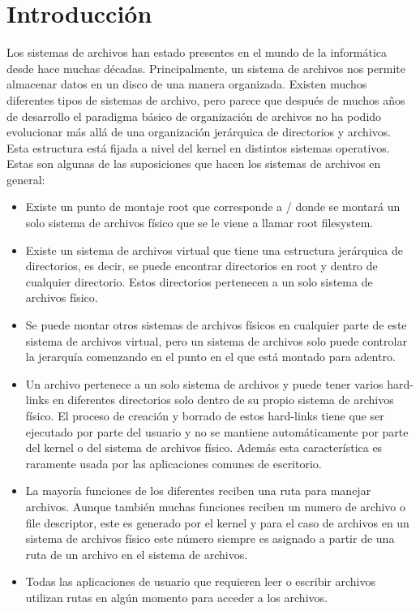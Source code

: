 \chapter{Introducción}
\ifpdf
    \graphicspath{{Introduction/IntroductionFigs/PNG/}{Introduction/IntroductionFigs/PDF/}{Introduction/IntroductionFigs/}}
\else
    \graphicspath{{Introduction/IntroductionFigs/EPS/}{Introduction/IntroductionFigs/}}
\fi

Los sistemas de archivos han estado presentes en el mundo de la informática desde hace muchas décadas. Principalmente, un sistema de archivos nos permite almacenar datos en un disco de una manera organizada. Existen muchos diferentes tipos de sistemas de archivo, pero parece que después de muchos años de desarrollo el paradigma básico de organización de archivos no ha podido evolucionar más allá de una organización jerárquica de directorios y archivos. Esta estructura está fijada a nivel del kernel en distintos sistemas operativos. Estas son algunas de las suposiciones que hacen los sistemas de archivos en general:

\begin{itemize}
\item Existe un punto de montaje root que corresponde a / donde se montará un solo sistema de archivos físico que se le viene a llamar root filesystem.
\item Existe un sistema de archivos virtual que tiene una estructura jerárquica de directorios, es decir, se puede encontrar directorios en root y dentro de cualquier directorio. Estos directorios pertenecen a un solo sistema de archivos físico.
\item Se puede montar otros sistemas de archivos físicos en cualquier parte de este sistema de archivos virtual, pero un sistema de archivos solo puede controlar la jerarquía comenzando en el punto en el que está montado para adentro.
\item Un archivo pertenece a un solo sistema de archivos y puede tener varios hard-links en diferentes directorios solo dentro de su propio sistema de archivos físico. El proceso de creación y borrado de estos hard-links tiene que ser ejecutado por parte del usuario y no se mantiene automáticamente por parte del kernel o del sistema de archivos físico. Además esta característica es raramente usada por las aplicaciones comunes de escritorio.
\item La mayoría funciones de los diferentes reciben una ruta para manejar archivos. Aunque también muchas funciones reciben un numero de archivo o file descriptor, este es generado por el kernel y para el caso de archivos en un sistema de archivos físico este número siempre es asignado a partir de una ruta de un archivo en el sistema de archivos.
\item Todas las aplicaciones de usuario que requieren leer o escribir archivos utilizan rutas en algún momento para acceder a los archivos.
\end{itemize}


